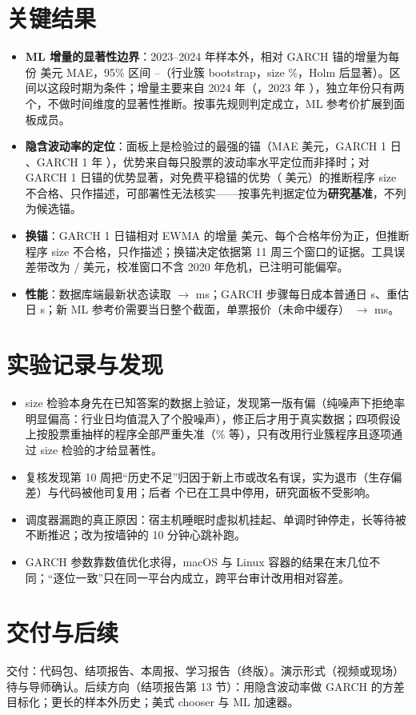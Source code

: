 \documentclass[11pt]{ctexart}
\begin{document}
\section{关键结果}
\begin{itemize}
  \item \textbf{ML 增量的显著性边界}：2023--2024 年样本外，相对 GARCH 锚的增量为每份 \rnHTwoDelta{} 美元 MAE，95\% 区间 \rnHTwoLo--\rnHTwoHi（行业簇 bootstrap，size \rnHTwoSizeSector\%，Holm 后显著）。区间以这段时期为条件；增量主要来自 2024 年（\rnHTwoYFour，2023 年 \rnHTwoYThree），独立年份只有两个，不做时间维度的显著性推断。按事先规则判定成立，ML 参考价扩展到面板成员。
  \item \textbf{隐含波动率的定位}：面板上是检验过的最强的锚（MAE \rnIvMaeIv{} 美元，GARCH 1 日 \rnIvMaeGd、GARCH 1 年 \rnIvMaeGy），优势来自每只股票的波动率水平定位而非择时；对 GARCH 1 日锚的优势显著，对免费平稳锚的优势（\rnHFourDelta{} 美元）的推断程序 size 不合格、只作描述，可部署性无法核实——按事先判据定位为\textbf{研究基准}，不列为候选锚。
  \item \textbf{换锚}：GARCH 1 日锚相对 EWMA 的增量 \rnHOneDelta{} 美元、每个合格年份为正，但推断程序 size 不合格，只作描述；换锚决定依据第 11 周三个窗口的证据。工具误差带改为 \rnBandGCalm{} / \rnBandGFear{} 美元，校准窗口不含 2020 年危机，已注明可能偏窄。
  \item \textbf{性能}：数据库端最新状态读取 \rnLatestBeforeMs{} $\to$ \rnLatestFinalMs{} ms；GARCH 步骤每日成本普通日 \rnGarchOrdS{} s、重估日 \rnGarchRefitS{} s；新 ML 参考价需要当日整个截面，单票报价（未命中缓存）\rnWnineQuoteMs{} $\to$ \rnFinalScalarMs{} ms。
\end{itemize}

\section{实验记录与发现}
\begin{itemize}
  \item size 检验本身先在已知答案的数据上验证，发现第一版有偏（纯噪声下拒绝率明显偏高：行业日均值混入了个股噪声），修正后才用于真实数据；四项假设上按股票重抽样的程序全部严重失准（\rnHTwoSizeTicker\% 等），只有改用行业簇程序且逐项通过 size 检验的才给显著性。
  \item 复核发现第 10 周把“历史不足”归因于新上市或改名有误，实为退市（生存偏差）与代码被他司复用；后者 \rnPostExit{} 个已在工具中停用，研究面板不受影响。
  \item 调度器漏跑的真正原因：宿主机睡眠时虚拟机挂起、单调时钟停走，长等待被不断推迟；改为按墙钟的 10 分钟心跳补跑。
  \item GARCH 参数靠数值优化求得，macOS 与 Linux 容器的结果在末几位不同；“逐位一致”只在同一平台内成立，跨平台审计改用相对容差。
\end{itemize}

\section{交付与后续}
交付：代码包、结项报告、本周报、学习报告（终版）。演示形式（视频或现场）待与导师确认。后续方向（结项报告第 13 节）：用隐含波动率做 GARCH 的方差目标化；更长的样本外历史；美式 chooser 与 ML 加速器。
\end{document}
